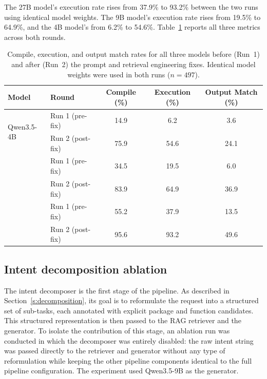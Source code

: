The 27B model's execution rate rises from 37.9\% to 93.2\% between the two
runs using identical model weights. The 9B model's execution rate rises from
19.5\% to 64.9\%, and the 4B model's from 6.2\% to 54.6\%. Table~\ref{tab:two-rounds}
reports all three metrics across both rounds.

\begin{table}[h]
\centering
{\renewcommand\arraystretch{1.1}
\small
\begin{tabular}{llccc}
\toprule
\textbf{Model} & \textbf{Round} & \textbf{Compile (\%)} & \textbf{Execution (\%)} & \textbf{Output Match (\%)} \\
\midrule
\multirow{2}{*}{Qwen3.5-4B}  & Run 1 (pre-fix)  & 14.9 & 6.2  & 3.6  \\
                              & Run 2 (post-fix) & 75.9 & 54.6 & 24.1 \\
\addlinespace
\multirow{2}{*}{Qwen3.5-9B}  & Run 1 (pre-fix)  & 34.5 & 19.5 & 6.0  \\
                              & Run 2 (post-fix) & 83.9 & 64.9 & 36.9 \\
\addlinespace
\multirow{2}{*}{Qwen3.6-27B} & Run 1 (pre-fix)  & 55.2 & 37.9 & 13.5 \\
                              & Run 2 (post-fix) & 95.6 & 93.2 & 49.6 \\
\bottomrule
\end{tabular}}
\caption[Compile, execution and output match across two evaluation rounds]{Compile, execution, and output match rates for all three models
before (Run~1) and after (Run~2) the prompt and retrieval engineering fixes.
Identical model weights were used in both runs ($n = 497$).}
\label{tab:two-rounds}
\end{table}


\subsection{Intent decomposition ablation}\label{s:eval-decomp}

The intent decomposer is the first stage of the pipeline. As described in Section~\ref{s:decomposition}, 
its goal is to reformulate the request into a structured set of
sub-tasks, each annotated with explicit package and function candidates. This
structured representation is then passed to the RAG retriever and the
generator. 
To isolate the contribution of this stage, an ablation run was
conducted in which the decomposer was entirely disabled: the raw intent string
was passed directly to the retriever and generator without any type of 
reformulation while keeping the other pipeline components identical to the full pipeline 
configuration. The experiment used Qwen3.5-9B as the generator.

